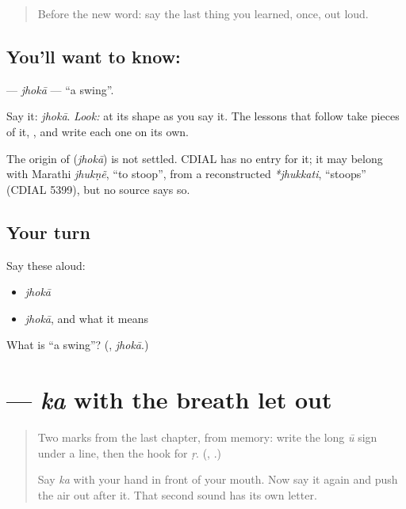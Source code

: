 \label{lesson:MR-C06-jhoka}



\begin{quote}
Before the new word: say the last thing you learned, once, out loud.
\end{quote}

\subsection*{You'll want to know: }
\textbf{} — \emph{jhokā} — \textquotedblleft{}a swing\textquotedblright{}.

Say it: \emph{jhokā}. \emph{Look:} at its shape as you say it. The lessons that follow take pieces of it, \textbf{}, and write each one on its own.

\begin{cousinweb}
The origin of \textbf{} (\emph{jhokā}) is not settled. CDIAL has no entry for it; it may belong with Marathi \emph{jhukṇẽ}, \textquotedblleft{}to stoop\textquotedblright{}, from a reconstructed \emph{*jhukkati}, \textquotedblleft{}stoops\textquotedblright{} (CDIAL 5399), but no source says so.
\end{cousinweb}

\subsection*{Your turn}
Say these aloud:

\begin{itemize}
\raggedright
  \item \emph{jhokā}
  \item \emph{jhokā}, and what it means
\end{itemize}

\begin{tcolorbox}[breakable,colback=teal!4,colframe=teal!35!black,title={Before you move on}]
What is \textquotedblleft{}a swing\textquotedblright{}? (\textbf{}, \emph{jhokā}.)
\end{tcolorbox}
\section[\texorpdfstring{\mr{ख} (kha)}{ख (kha)}]{ — \emph{ka} with the breath let out}

\label{lesson:MR-W06-kha}



\begin{quote}
Two marks from the last chapter, from memory: write the long \emph{ū} sign under a line, then the hook for \emph{ṛ}. (\textbf{}, \textbf{}.)

Say \emph{ka} with your hand in front of your mouth. Now say it again and push the air out after it. That second sound has its own letter.
\end{quote}

